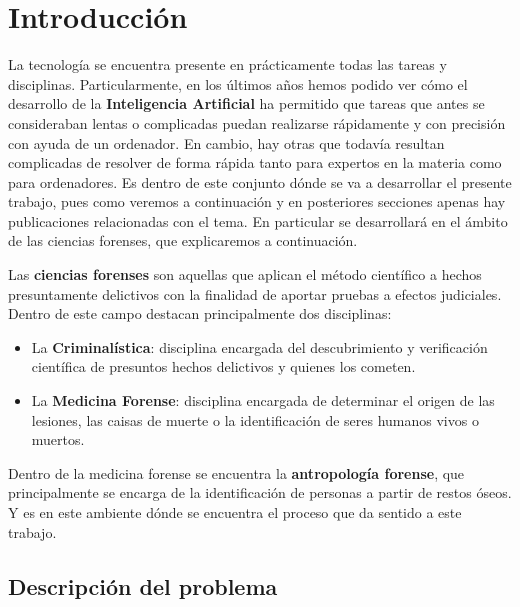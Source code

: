 
\chapter{Introducción}  \label{ch:Introduccion_informatica}

\noindent La tecnología se encuentra presente en prácticamente todas las tareas y disciplinas. Particularmente, en los últimos años hemos podido ver cómo el desarrollo de la \textbf{Inteligencia Artificial} ha permitido que tareas que antes se consideraban lentas o complicadas puedan realizarse rápidamente y con precisión con ayuda de un ordenador. En cambio, hay otras que todavía resultan complicadas de resolver de forma rápida tanto para expertos en la materia como para ordenadores. Es dentro de este conjunto dónde se va a desarrollar el presente trabajo, pues como veremos a continuación y en posteriores secciones apenas hay publicaciones relacionadas con el tema. En particular se desarrollará en el ámbito de las ciencias forenses, que explicaremos a continuación.

\medskip

\noindent Las \textbf{ciencias forenses} son aquellas que aplican el método científico a hechos presuntamente delictivos con la finalidad de aportar pruebas a efectos judiciales. Dentro de este campo destacan principalmente dos disciplinas: 

\begin{itemize}
    \item La \textbf{Criminalística}: disciplina encargada del descubrimiento y verificación científica de presuntos hechos delictivos y quienes los cometen.
    \item La \textbf{Medicina Forense}: disciplina encargada de determinar el origen de las lesiones, las caisas de muerte o la identificación de seres humanos vivos o muertos.
\end{itemize}

\medskip

\noindent Dentro de la medicina forense se encuentra la \textbf{antropología forense}, que principalmente se encarga de la identificación de personas a partir de restos óseos. Y es en este ambiente dónde se encuentra el proceso que da sentido a este trabajo.


\section{Descripción del problema}


